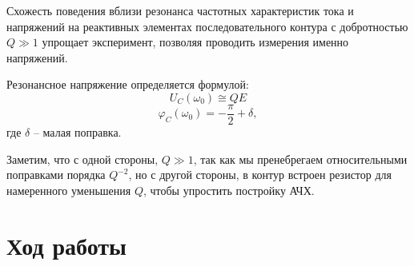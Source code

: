 \documentclass[a4paper, 12pt]{article}%
\begin{document}
	Схожесть поведения вблизи резонанса частотных характеристик тока и напряжений на реактивных элементах последовательного контура с добротностью $ Q \gg 1 $ упрощает эксперимент, позволяя проводить измерения именно напряжений.
	
	Резонансное напряжение определяется формулой:
	\begin{equation}\label{resc}
		U_C (\omega_0) \cong Q E
	\end{equation}
	\begin{equation*}
		\varphi_C (\omega_0) = -\frac{\pi}{2}+\delta,
	\end{equation*}
	где $ \delta  $ -- малая поправка.
	
	Заметим, что с одной стороны, $ Q \gg 1 $, так как мы пренебрегаем относительными поправками порядка $ Q^{-2} $, но с другой стороны, в контур встроен резистор для намеренного уменьшения $ Q $, чтобы упростить постройку АЧХ.
	\section{Ход работы}
\end{document}
